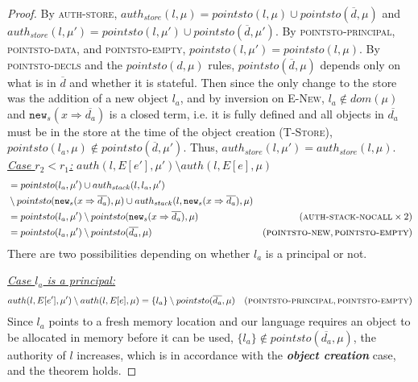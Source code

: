\documentclass{llncs}
\newcommand{\keywadj}[1]{\mathtt{#1}}
\begin{document}
\begin{proof}
By \textsc{auth-store}, $auth_{store}(l, \mu) = pointsto(l, \mu) \cup pointsto(\overline{d}, \mu)$ and $auth_{store}(l, \mu') = pointsto(l, \mu') \cup pointsto(\overline{d}, \mu')$. By \textsc{pointsto-principal}, \textsc{pointsto-data}, and \textsc{pointsto-empty}, $pointsto(l, \mu') = pointsto(l, \mu)$. By \textsc{pointsto-decls} and the $pointsto(d, \mu)$ rules, $pointsto(\overline{d}, \mu)$ depends only on what is in $\overline{d}$ and whether it is stateful. Then since the only change to the store was the addition of a new object $l_a$, and by inversion on \textsc{E-New}, $l_a \not\in dom(\mu)$ and $\keywadj{new}_s(x \Rightarrow \overline{d_a})$ is a closed term, i.e. it is fully defined and all objects in $\overline{d_a}$ must be in the store at the time of the object creation (\textsc{T-Store}), $pointsto(l_a, \mu) \not\in pointsto(\overline{d}, \mu')$. Thus, $auth_{store}(l, \mu') = auth_{store}(l, \mu)$.\\

\noindent\underline{\underline{\textit{Case $r_2 < r_1$:}}}
\noindent$auth(l, E[e'], \mu') \setminus auth(l, E[e], \mu)$
\vspace{-7pt}
\begin{align*}
&= pointsto(l_a, \mu') \cup auth_{stack}(l, l_a, \mu')\\
& \setminus pointsto(\keywadj{new}_s(x \Rightarrow \overline{d_a}), \mu) \cup auth_{stack}(l, \keywadj{new}_s(x \Rightarrow \overline{d_a}), \mu)\\
&= pointsto(l_a, \mu') \setminus pointsto(\keywadj{new}_s(x \Rightarrow \overline{d_a}), \mu) & (\textsc{auth-stack-nocall} \times 2)\\
&= pointsto(l_a, \mu') \setminus pointsto(\overline{d_a}, \mu) & (\textsc{pointsto-new}, \textsc{pointsto-empty})
\end{align*}
There are two possibilities depending on whether $l_a$ is a principal or not.

\noindent\underline{\textit{Case $l_a$ is a principal:}}
\vspace{-7pt}
\begin{align*}
auth(l, E[e'], \mu') \setminus auth(l, E[e], \mu) &= \{ l_a \} \setminus pointsto(\overline{d_a}, \mu) & (\textsc{pointsto-principal}, \textsc{pointsto-empty}) 
\end{align*}
Since $l_a$ points to a fresh memory location and our language requires an object to be allocated in memory before it can be used, $\{ l_a \} \not\in pointsto(\overline{d_a}, \mu)$, the authority of $l$ increases, which is in accordance with the \textbf{\textit{object creation}} case, and the theorem holds.


\end{proof}
\end{document}
